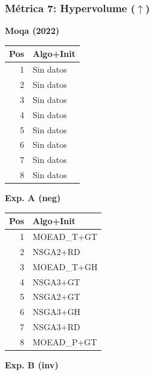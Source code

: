 \documentclass[a4paper,10pt]{article}
\begin{document}
\subsubsection{Métrica 7: Hypervolume \texorpdfstring{($\uparrow$)}{(up)}}
\begin{table}[H]
    \centering
    \begin{minipage}[t]{0.32\textwidth}
        \centering\scriptsize\textbf{Moqa (2022)}\\
        \begin{tabular}{rl}
            \toprule
            Pos & Algo+Init \\ \midrule
            1 & Sin datos \\
            2 & Sin datos \\
            3 & Sin datos \\
            4 & Sin datos \\
            5 & Sin datos \\
            6 & Sin datos \\
            7 & Sin datos \\
            8 & Sin datos \\
            \bottomrule
        \end{tabular}
    \end{minipage}
    \hfill
    \begin{minipage}[t]{0.32\textwidth}
        \centering\scriptsize\textbf{Exp. A (neg)}\\
        \begin{tabular}{rl}
            \toprule
            Pos & Algo+Init \\ \midrule
            1 & MOEAD\_T+GT \\
            2 & NSGA2+RD \\
            3 & MOEAD\_T+GH \\
            4 & NSGA3+GT \\
            5 & NSGA2+GT \\
            6 & NSGA3+GH \\
            7 & NSGA3+RD \\
            8 & MOEAD\_P+GT \\
            \bottomrule
        \end{tabular}
    \end{minipage}
    \hfill
    \begin{minipage}[t]{0.32\textwidth}
        \centering\scriptsize\textbf{Exp. B (inv)}\\
        \begin{tabular}{rl}

\end{tabular}
\end{minipage}
\end{table}
\end{document}
